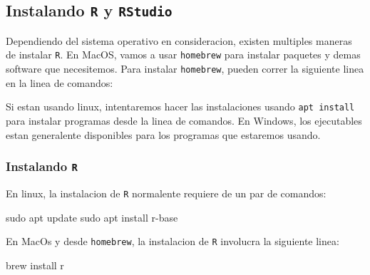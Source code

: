 \documentclass[
]{book}
\newenvironment{Shaded}{\begin{snugshade}}{\end{snugshade}}
\newcommand{\AttributeTok}[1]{\textcolor[rgb]{0.77,0.63,0.00}{#1}}
\newcommand{\ExtensionTok}[1]{#1}
\newcommand{\FunctionTok}[1]{\textcolor[rgb]{0.00,0.00,0.00}{#1}}
\newcommand{\NormalTok}[1]{#1}
\newcommand{\StringTok}[1]{\textcolor[rgb]{0.31,0.60,0.02}{#1}}
\newcommand{\VariableTok}[1]{\textcolor[rgb]{0.00,0.00,0.00}{#1}}
\begin{document}
\hypertarget{instalando-r-y-rstudio}{%
\subsection{\texorpdfstring{Instalando \texttt{R} y \texttt{RStudio}}{Instalando R y RStudio}}\label{instalando-r-y-rstudio}}

Dependiendo del sistema operativo en consideracion, existen multiples maneras de instalar \texttt{R}. En MacOS, vamos a usar \texttt{homebrew} para instalar paquetes y demas software que necesitemos. Para instalar \texttt{homebrew}, pueden correr la siguiente linea en la linea de comandos:

\begin{Shaded}
\end{Shaded}

Si estan usando linux, intentaremos hacer las instalaciones usando \texttt{apt\ install} para instalar programas desde la linea de comandos. En Windows, los ejecutables estan generalente disponibles para los programas que estaremos usando.

\hypertarget{instalando-r}{%
\subsubsection{\texorpdfstring{Instalando \texttt{R}}{Instalando R}}\label{instalando-r}}

En linux, la instalacion de \texttt{R} normalente requiere de un par de comandos:

\begin{Shaded}
\begin{Highlighting}[]
\FunctionTok{sudo}\NormalTok{ apt update}
\FunctionTok{sudo}\NormalTok{ apt install r{-}base}
\end{Highlighting}
\end{Shaded}

En MacOs y desde \texttt{homebrew}, la instalacion de \texttt{R} involucra la siguiente linea:

\begin{Shaded}
\begin{Highlighting}[]
\ExtensionTok{brew}\NormalTok{ install r}
\end{Highlighting}
\end{Shaded}
\end{document}
